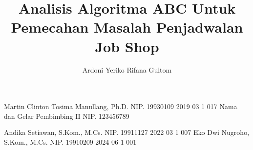 \documentclass[11pt, a5paper, onecolumn, final]{report} %
\begin{document}

    
    \title{Analisis Algoritma ABC Untuk Pemecahan Masalah Penjadwalan Job Shop} %
    
    \author{Ardoni Yeriko Rifana Gultom}		%
	
	\dosbingA%
		{Martin Clinton Tosima Manullang, Ph.D.}%
		{NIP. 19930109 2019 03 1 017}				%
	\dosbingB%
		{Nama dan Gelar Pembimbing II}%
		{NIP. 123456789}				%
		
	\pengujiA%
		{Andika Setiawan, S.Kom., M.Cs.}%
		{NIP. 19911127 2022 03 1 007}				%
	\pengujiB%
		{Eko Dwi Nugroho, S.Kom., M.Cs.}%
		{NIP. 19910209 2024 06 1 001}				%

	\sloppy %
    \setcounter{page}{1} %

    \clearpage
    \pagestyle{alternatingstyle}
    
%    
%   

    \tableofcontents
    \pagebreak
    \listoftables
    \pagebreak
    \listoffigures
    \pagebreak
    \listofmyequations
%    
    \lstlistoflistings
    \pagebreak
    
\end{document}
